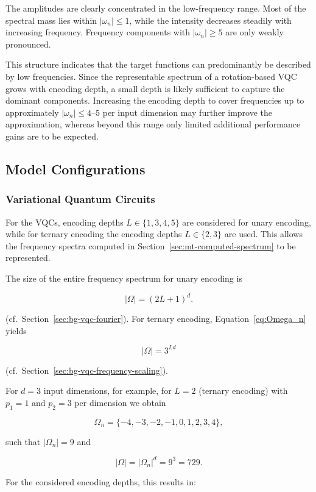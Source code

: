 The amplitudes are clearly concentrated in the low-frequency range.
Most of the spectral mass lies within
$|\omega_n| \leq 1$, while the intensity decreases steadily
with increasing frequency.
Frequency components with $|\omega_n| \geq 5$ are only weakly pronounced.

This structure indicates that the target functions
can predominantly be described by low frequencies.
Since the representable spectrum of a rotation-based VQC
grows with encoding depth,
a small depth is likely sufficient to capture the dominant components.
Increasing the encoding depth to cover frequencies up to approximately
$|\omega_n| \leq 4\text{--}5$ per input dimension
may further improve the approximation,
whereas beyond this range only limited additional
performance gains are to be expected.



\subsection{Model Configurations}
\label{sec:mt-model-config}

\subsubsection{Variational Quantum Circuits}

For the VQCs, encoding depths
$L \in \{1,3,4,5\}$ are considered for unary encoding,
while for ternary encoding
the encoding depths $L \in \{2,3\}$ are used.
This allows the frequency spectra computed in
Section~\ref{sec:mt-computed-spectrum} to be represented.

The size of the entire frequency spectrum for unary encoding is

\[
|\Omega| = (2L+1)^d .
\]

(cf.~Section~\ref{sec:bg-vqc-fourier}).
For ternary encoding, Equation~\ref{eq:Omega_n} yields

\[
|\Omega| = 3^{Ld}
\]

(cf.~Section~\ref{sec:bg-vqc-frequency-scaling}).

For $d=3$ input dimensions, for example,
for $L=2$ (ternary encoding) with $p_1=1$ and $p_2=3$ per dimension we obtain

\[
\Omega_n =
\{-4,-3,-2,-1,0,1,2,3,4\},
\]

such that $|\Omega_n| = 9$ and

\[
|\Omega| = |\Omega_n|^d = 9^3 = 729.
\]

For the considered encoding depths, this results in:

